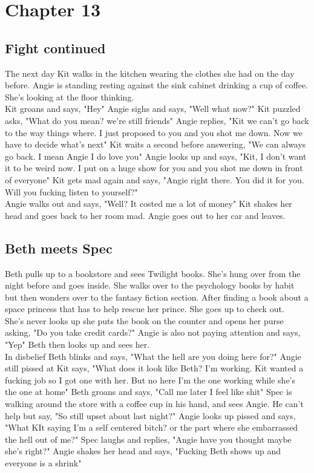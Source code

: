 \documentclass{article}[12px] %
\begin{document}
\section* {Chapter 13}        %
\subsection* {Fight continued}%
The next day Kit walks in the kitchen wearing the clothes she had on the day before. Angie is standing resting against the sink cabinet drinking a cup of coffee. She's looking at the floor thinking.\\

Kit groans and says, "Hey" Angie sighs and says, "Well what now?" Kit puzzled asks, "What do you mean? we're still friends" Angie replies, "Kit we can't go back to the way things where. I just proposed to you and you shot me down. Now we have to decide what's next" Kit waits a second before answering, "We can always go back. I mean Angie I do love you" Angie looks up and says, "Kit, I don't want it to be weird now. I put on a huge show for you and you shot me down in front of everyone" Kit gets mad again and says, "Angie right there. You did it for you. Will you fucking listen to yourself?" \\

Angie walks out and says, "Well? It costed me a lot of money" Kit shakes her head and goes back to her room mad. Angie goes out to her car and leaves.\\

\subsection* {Beth meets Spec}
Beth pulls up to a bookstore and sees Twilight books. She's hung over from the night before and goes inside. She walks over to the psychology books by habit but then wonders over to the fantasy fiction section.  After finding a book about a space princess that has to help rescue her prince. She goes up to check out.\\

She's never looks up she puts the book on the counter and opens her purse asking, "Do you take credit cards?" Angie is also not paying attention and says, "Yep" Beth then looks up and sees her.\\

In disbelief Beth blinks and says, "What the hell are you doing here for?" Angie still pissed at Kit says, "What does it look like Beth? I'm working. Kit wanted a fucking job so I got one with her. But no here I'm the one working while she's the one at home" Beth groans and says, "Call me later I feel like shit" Spec is walking around the store with a coffee cup in his hand, and sees Angie. He can't help but say, "So still upset about last night?" Angie looks up pissed and says, "What KIt saying I'm a self centered bitch? or the part where she embarrassed the hell out of me?" Spec laughs and replies, "Angie have you thought maybe she's right?" Angie shakes her head and says, "Fucking Beth shows up and everyone is a shrink"\\
\end{document}
